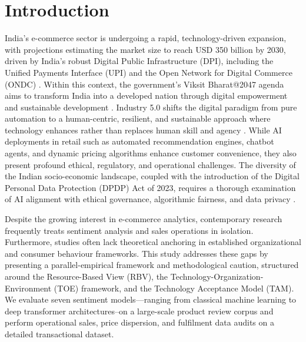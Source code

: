 \documentclass[authoryear,review,3p,times,12pt]{elsarticle}
\begin{document}


\section{Introduction}
\label{sec:intro}
India's e-commerce sector is undergoing a rapid, technology-driven expansion, with projections estimating the market size to reach USD 350 billion by 2030, driven by India's robust Digital Public Infrastructure (DPI), including the Unified Payments Interface (UPI) and the Open Network for Digital Commerce (ONDC) \citep{RAHMAN2026100020}. Within this context, the government's Viksit Bharat@2047 agenda aims to transform India into a developed nation through digital empowerment and sustainable development \citep{nitiaayog2026dpi}. Industry 5.0 shifts the digital paradigm from pure automation to a human-centric, resilient, and sustainable approach where technology enhances rather than replaces human skill and agency \citep{TOTH2023102260, martini16135448}. While AI deployments in retail such as automated recommendation engines, chatbot agents, and dynamic pricing algorithms enhance customer convenience, they also present profound ethical, regulatory, and operational challenges. The diversity of the Indian socio-economic landscape, coupled with the introduction of the Digital Personal Data Protection (DPDP) Act of 2023, requires a thorough examination of AI alignment with ethical governance, algorithmic fairness, and data privacy \citep{Sundara2023129141, Naithani20240174}.

Despite the growing interest in e-commerce analytics, contemporary research frequently treats sentiment analysis and sales operations in isolation. Furthermore, studies often lack theoretical anchoring in established organizational and consumer behaviour frameworks. This study addresses these gaps by presenting a parallel-empirical framework and methodological caution, structured around the Resource-Based View (RBV), the Technology-Organization-Environment (TOE) framework, and the Technology Acceptance Model (TAM). We evaluate seven sentiment models—ranging from classical machine learning to deep transformer architectures–on a large-scale product review corpus and perform operational sales, price dispersion, and fulfilment data audits on a detailed transactional dataset.
\end{document}
